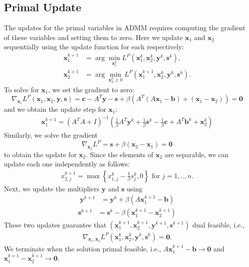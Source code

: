 \documentclass{article}
\begin{document}
\subsection*{Primal Update}
The updates for the primal variables in ADMM requires computing the gradient of these variables and setting them to zero. Here we update $\mathbf{x}_{1}$ and $\mathbf{x}_{2}$ sequentially using the update function for each respectively:
\begin{align}
\mathbf{x}_{1}^{k+1} & = \arg \min_{\mathbf{x}_{1}^{k}} L^{P}(\mathbf{x}_{1}^{k},\mathbf{x}_{2}^{k},\mathbf{y}^{k},\mathbf{s}^k),\\
\mathbf{x}_{2}^{k+1} & = \arg \min_{\mathbf{x}_{2}^{k} \geq 0} L^{P}(\mathbf{x}_{1}^{k+1},\mathbf{x}_{2}^{k},\mathbf{y}^{k},\mathbf{s}^k).
\end{align}
To solve for $\mathbf{x}_{1}$, we set the gradient to zero:
\[
\nabla_{\mathbf{x}_{1}}L^{P}(\mathbf{x}_{1},\mathbf{x}_{2},\mathbf{y}, \mathbf{s})=\mathbf{c}-A^{T}\mathbf{y}-\mathbf{s}+\beta\left(A^{T}\left(A\mathbf{x}_{1}-\mathbf{b}\right)+\left(\mathbf{x}_{1}-\mathbf{x}_{2}\right)\right) = \mathbf{0}
\]
and we obtain the update step for $\mathbf{x}_{1}$:
\begin{align}\label{eq:x1_primal_update}
\mathbf{x}_{1}^{k+1} = \left(A^{T}A+I\right)^{-1}\left(\frac{1}{\beta}A^{T}\mathbf{y}^k+\frac{1}{\beta}\mathbf{s}^k-\frac{1}{\beta}\mathbf{c}+A^{T}\mathbf{b}^k+\mathbf{x}_{2}^k\right)
\end{align}
Similarly, we solve the gradient 
\[
\nabla_{\mathbf{x}_{2}}L^{P}=\mathbf{s}+\beta\left(\mathbf{x}_{2}-\mathbf{x}_{1}\right) = \mathbf{0}
\]
to obtain the update for $\mathbf{x}_{2}$. Since the elements of $\mathbf{x}_{2}$ are separable, we can update each one independently as follows:
\begin{align}
{x}_{2,j}^{k+1} = \max\left\{ {x}_{1,j}^k-\frac{1}{\beta}{s}_j^k,0\right\} \text{ for $j = 1,..,n$}.
\end{align}
Next, we update the multipliers $\mathbf{y}$ and $\mathbf{s}$ using
\begin{align}\label{eq:y_primal_update}
\mathbf{y}^{k+1} &= \mathbf{y}^{k} + \beta (A \mathbf{x}_1^{k+1}  - \mathbf{b}) 
\end{align}
\begin{align}\label{eq:s_primal_update}
\mathbf{s}^{k+1} &= \mathbf{s}^{k}  - \beta  (\mathbf{x}_1^{k+1}  -\mathbf{x}_2^{k+1} )
\end{align}
These two updates guarantee that $\left(\mathbf{x}_1^{k+1}, \mathbf{x}_2^{k+1}, \mathbf{y}^{k+1}, \mathbf{s}^{k+1}\right)$ dual feasible, i.e.,
\begin{align*}
\nabla_{\mathbf{x}_{1}, \mathbf{x}_{2}}L^{P}(\mathbf{x}_{1}^k,\mathbf{x}_{2}^k,\mathbf{y}^k ,\mathbf{s}^k)=\mathbf{0}.
\end{align*}
We terminate when the solution primal feasible, i.e., $A \mathbf{x}_1^{k+1}  - \mathbf{b} \to \mathbf{0}$ and $\mathbf{x}_1^{k+1}  -\mathbf{x}_2^{k+1} \to \mathbf{0}$.
\end{document}
